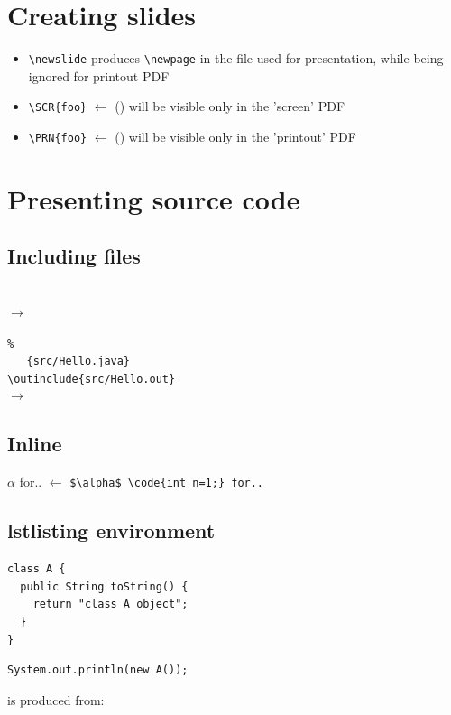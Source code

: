 

\section{Creating slides}
\begin{itemize}
\item 
\verb|\newslide| produces \verb|\newpage| in the file
used for presentation, while being ignored for printout PDF
\item 
\verb|\SCR{foo}|  $\leftarrow$ () will be visible only in the
'screen' PDF
\item 
\verb|\PRN{foo}|  $\leftarrow$ () will be visible only in the
'printout' PDF
\end{itemize}

\newslide

\section{Presenting source code}


\subsection{Including files}
\verb||\\
$\to$

\newslide
\verb|%|\\
\verb|   {src/Hello.java}|\\
\verb|\outinclude{src/Hello.out}|\\
$\to$


\subsection{Inline}
$\alpha$  for..  $\leftarrow$ \verb|$\alpha$ \code{int n=1;} for..|\\

\newslide
\subsection{lstlisting environment}
\begin{lstlisting}
class A {
  public String toString() {
    return "class A object";
  }
}
\end{lstlisting}
\begin{lstlisting}
System.out.println(new A());
\end{lstlisting}
\SCR{~\\~\\~\\~\\~\\}
is produced from:
\newslide


